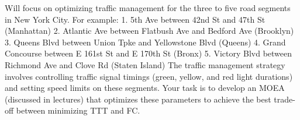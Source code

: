 Will focus on optimizing traffic management for the three to five road segments in New 
York City. For example: 
1. 5th Ave between 42nd St and 47th St (Manhattan) 
2. Atlantic Ave between Flatbush Ave and Bedford Ave (Brooklyn) 
3. Queens Blvd between Union Tpke and Yellowstone Blvd (Queens) 
4. Grand Concourse between E 161st St and E 170th St (Bronx) 
5. Victory Blvd between Richmond Ave and Clove Rd (Staten Island) 
The traffic management strategy involves controlling traffic signal timings (green, yellow, and 
red light durations) and setting speed limits on these segments. Your task is to develop an 
MOEA (discussed in lectures) that optimizes these parameters to achieve the best trade-off 
between minimizing TTT and FC.